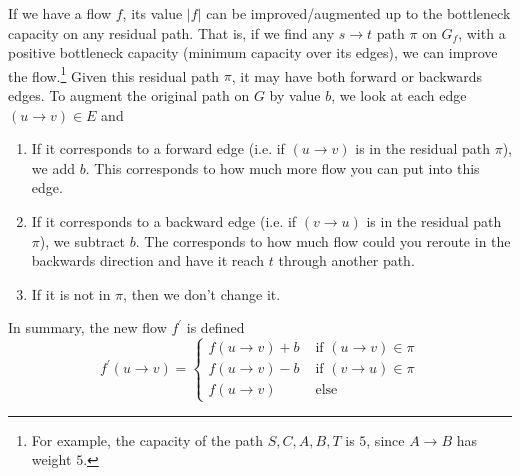   \begin{theorem}
    If we have a flow $f$, its value $|f|$ can be improved/augmented up to the bottleneck capacity on any residual path. That is, if we find any $s \rightarrow t$ path $\pi$ on $G_f$, with a positive bottleneck capacity (minimum capacity over its edges), we can improve the flow.\footnote{For example, the capacity of the path $S, C, A, B, T$ is $5$, since $A \rightarrow B$ has weight $5$.} Given this residual path $\pi$, it may have both forward or backwards edges. To augment the original path on $G$ by value $b$, we look at each edge $(u \rightarrow v) \in E$ and 
    \begin{enumerate}
      \item If it corresponds to a forward edge (i.e. if $(u \rightarrow v)$ is in the residual path $\pi$), we add $b$. This corresponds to how much more flow you can put into this edge. 
      \item If it corresponds to a backward edge (i.e. if $(v \rightarrow u)$ is in the residual path $\pi$), we subtract $b$. The corresponds to how much flow could you reroute in the backwards direction and have it reach $t$ through another path.   
      \item If it is not in $\pi$, then we don't change it. 
    \end{enumerate}
    In summary, the new flow $f^\prime$ is defined 
    \begin{equation}
      f^\prime (u \rightarrow v) = \begin{cases} 
        f(u \rightarrow v) + b & \text{ if } (u \rightarrow v) \in \pi \\ 
        f(u \rightarrow v) - b & \text{ if } (v \rightarrow u) \in \pi \\  
        f(u \rightarrow v) & \text{ else }
      \end{cases}
    \end{equation}
  \end{theorem} 
